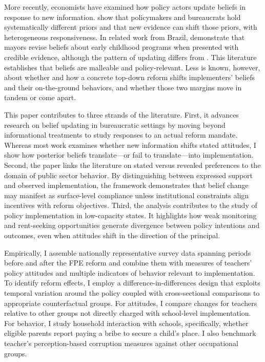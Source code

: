 \documentclass[hidelinks,12pt]{article}
\begin{document}
\begin{singlespace}
More recently, economists have examined how policy actors update beliefs in response to new information. \textcite{vivalt_how_2023} show that policymakers and bureaucrats hold systematically different priors and that new evidence can shift those priors, with heterogeneous responsiveness. In related work from Brazil, \textcite{hjort_how_2021} demonstrate that mayors revise beliefs about early childhood programs when presented with credible evidence, although the pattern of updating differs from \textcite{vivalt_how_2023}. This literature establishes that beliefs are malleable and policy-relevant. Less is known, however, about whether and how a concrete top-down reform shifts implementers’ beliefs and their on-the-ground behaviors, and whether those two margins move in tandem or come apart.

This paper contributes to three strands of the literature. First, it advances research on belief updating in bureaucratic settings by moving beyond informational treatments to study responses to an actual reform mandate. Whereas most work examines whether new information shifts stated attitudes, I show how posterior beliefs translate---or fail to translate---into implementation. Second, the paper links the literature on stated versus revealed preferences to the domain of public sector behavior. By distinguishing between expressed support and observed implementation, the framework demonstrates that belief change may manifest as surface-level compliance unless institutional constraints align incentives with reform objectives. Third, the analysis contributes to the study of policy implementation in low-capacity states. It highlights how weak monitoring and rent-seeking opportunities generate divergence between policy intentions and outcomes, even when attitudes shift in the direction of the principal. 

Empirically, I assemble nationally representative survey data spanning periods before and after the FPE reform and combine them with measures of teachers’ policy attitudes and multiple indicators of behavior relevant to implementation. To identify reform effects, I employ a difference-in-differences design that exploits temporal variation around the policy coupled with cross-sectional comparisons to appropriate counterfactual groups. For attitudes, I compare changes for teachers relative to other groups not directly charged with school-level implementation. For behavior, I study household interaction with schools, specifically, whether eligible parents report paying a bribe to secure a child’s place. I also benchmark teacher's perception-based corruption measures against other occupational groups. 


\end{singlespace}
\end{document}
